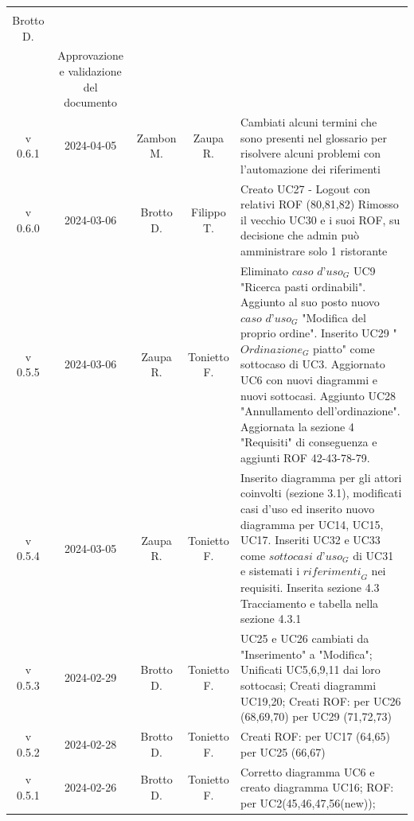 \documentclass[12pt, oneside]{article}
\begin{document}
\begin{longtable}{|c|c|c|c|p{7cm}|}
\begin{tabular}[c]{@{}c@{}}
    Zaupa R. \\
    Brotto D. \\
  \end{tabular} & Approvazione e validazione del documento\\
\hline
v 0.6.1 & 2024-04-05 & Zambon M. & Zaupa R. & Cambiati alcuni termini che sono presenti nel glossario per risolvere alcuni problemi con l’automazione dei riferimenti\\
\hline
v 0.6.0 & 2024-03-06 & Brotto D. & Filippo T. & Creato UC27 - Logout con relativi ROF (80,81,82) 
\newline Rimosso il vecchio UC30 e i suoi ROF, su decisione che admin può amministrare solo 1 ristorante
\\
\hline
v 0.5.5 & 2024-03-06 & Zaupa R. & Tonietto F. & Eliminato $\textit{caso d'uso}_G$ UC9 "Ricerca pasti ordinabili". Aggiunto al suo posto nuovo $\textit{caso d'uso}_G$ "Modifica del proprio ordine". Inserito UC29 "$\textit{Ordinazione}_G$ piatto" come sottocaso di UC3. Aggiornato UC6 con nuovi diagrammi e nuovi sottocasi. Aggiunto UC28 "Annullamento dell'ordinazione". Aggiornata la sezione 4 "Requisiti" di conseguenza e aggiunti ROF 42-43-78-79. \\
\hline
v 0.5.4 & 2024-03-05 & Zaupa R. & Tonietto F. & Inserito diagramma per gli attori coinvolti (sezione 3.1), modificati casi d'uso ed inserito nuovo diagramma per UC14, UC15, UC17. Inseriti UC32 e UC33 come $\textit{sottocasi d'uso}_G$ di UC31 e sistemati i $\textit{riferimenti}_G$ nei requisiti. Inserita sezione 4.3 Tracciamento e tabella nella sezione 4.3.1\\
\hline
v 0.5.3 & 2024-02-29 & Brotto D. & Tonietto F. & UC25 e UC26 cambiati da "Inserimento" a "Modifica";
\newline Unificati UC5,6,9,11 dai loro sottocasi;
\newline Creati diagrammi UC19,20;
\newline Creati ROF:
\newline per UC26 (68,69,70)
\newline per UC29 (71,72,73)
\\
\hline
v 0.5.2 & 2024-02-28 & Brotto D. & Tonietto F. & Creati ROF:
\newline per UC17 (64,65) 
\newline per UC25 (66,67)
\\
\hline
v 0.5.1 & 2024-02-26 & Brotto D. & Tonietto F. & Corretto diagramma UC6 e creato diagramma UC16; \newline ROF: per UC2(45,46,47,56(new)); 

\end{longtable}
\end{document}
